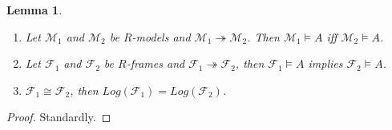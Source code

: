 \documentclass[a4paper]{article}
\theoremstyle{defin}
\theoremstyle{theorem}
\theoremstyle{prop}
\theoremstyle{lemma}
\newtheorem{lemma}{Lemma}
\theoremstyle{ex}
\theoremstyle{col}
\begin{document}
\begin{lemma}
$ $

  \begin{enumerate}
    \item Let $\mathcal{M}_1$ and $\mathcal{M}_2$ be $R$-models and $\mathcal{M}_1 \twoheadrightarrow \mathcal{M}_2$. Then $\mathcal{M}_1 \models A$ iff $\mathcal{M}_2 \models A$.

    \item Let $\mathcal{F}_1$ and $\mathcal{F}_2$ be $R$-frames and $\mathcal{F}_1 \twoheadrightarrow \mathcal{F}_2$,
    then $\mathcal{F}_1 \models A$ implies $\mathcal{F}_2 \models A$.

    \item $\mathcal{F}_1 \cong \mathcal{F}_2$, then $Log(\mathcal{F}_1) = Log(\mathcal{F}_2)$.
  \end{enumerate}
\end{lemma}

\begin{proof}
  Standardly.
\end{proof}
\end{document}
